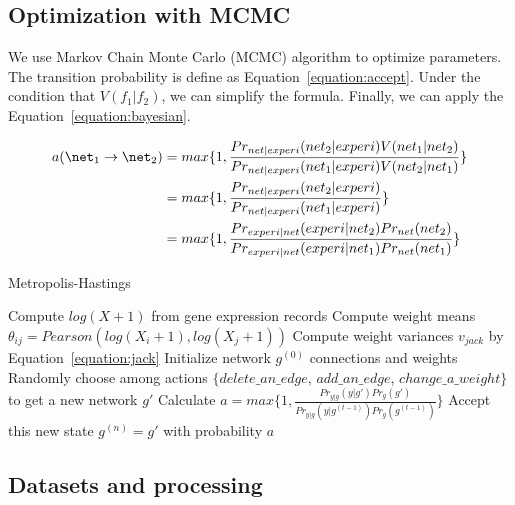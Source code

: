 \documentclass{bioinfo}
\begin{document}
\subsection{Optimization with MCMC}

We use Markov Chain Monte Carlo (MCMC) algorithm to optimize parameters. The transition probability is define as Equation~\ref{equation:accept}. Under the condition that $V(f_1|f_2)$, we can simplify the formula. Finally, we can apply the Equation~\ref{equation:bayesian}.

\begin{equation}\begin{split}
    a(\net_1\rightarrow \net_2)
    & = max\{1, \frac{Pr_{net|experi}(net_2|experi) V(net_1|net_2)}{Pr_{net|experi}(net_1|experi) V(net_2|net_1)}\}\\
    & = max\{1, \frac{Pr_{net|experi}(net_2|experi)}{Pr_{net|experi}(net_1|experi)}\}\\
    & = max\{1, \frac{Pr_{experi|net}(experi|net_2)Pr_{net}(net_2)}{Pr_{experi|net}(experi|net_1)Pr_{net}(net_1)}\}\\
\end{split}\label{equation:bayesian}\end{equation}

\begin{algorithm}[H]
\begin{algorithmic}
\caption{Metropolis-Hastings}
\label{algo:mcmc}
\STATE Compute $log(X+1)$ from gene expression records
\STATE Compute weight means $\theta_{ij}=Pearson(log(X_i+1), log(X_j+1))$
\STATE Compute weight variances $v_{jack}$ by Equation~\ref{equation:jack}
\STATE Initialize network $g^{(0)}$ connections and weights
\STATE Randomly choose among actions $\{delete\_an\_edge$, $add\_an\_edge$, $change\_a\_weight\}$ to get a new network $g'$
\STATE Calculate $a=max\{1, \frac{Pr_{y|g}(y|g')Pr_{g}(g')}{Pr_{y|g}(y|g^{(t-1)})Pr_{g}(g^{(t-1)})}\}$
\STATE Accept this new state $g^{(n)}=g'$ with probability $a$
\ENDIF
\ENDFOR
\end{algorithmic}
\end{algorithm}

\subsection{Datasets and processing}
\end{document}
